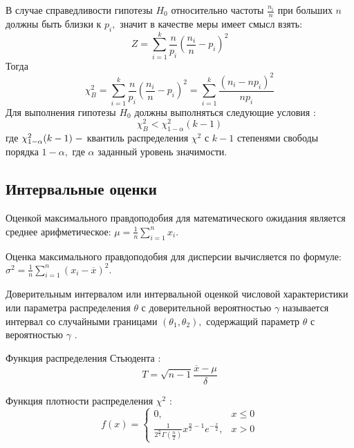 \documentclass[a4]{article}
\begin{document}
\begin{enumerate}
	В случае справедливости гипотезы $H_0$ относительно частоты $\frac{n_i}{n}$ при больших $n$ должны быть близки к $p_i,$ значит в качестве меры имеет смысл взять: 
	\begin{equation}
	    Z = \sum\limits_{i=1}^k\frac{n}{p_i}\left(\frac{n_i}{n}-p_i\right)^2
	\end{equation}
	Тогда
	\begin{equation}
	    \chi^2_B=\sum\limits_{i=1}^k\frac{n}{p_i}\left(\frac{n_i}{n}-p_i\right)^2=\sum\limits_{i=1}^k\frac{(n_i-np_i)^2}{np_i}
	\end{equation}
	Для выполнения гипотезы $H_0$ должны выполняться следующие условия :
	\begin{equation}
	    \chi_B^2 < \chi_{1-\alpha}^2(k-1)
	\end{equation}
	где $\chi_{1-\alpha}^2(k-1)\;\--$ квантиль распределения $\chi^2$ с $k-1$ степенями свободы порядка $1-\alpha,$ где $\alpha$ заданный уровень значимости.
		\end{enumerate}	
	\subsection{Интервальные оценки} %
	\label{sub:интервальные_оценки}
	Оценкой максимального правдоподобия для математического ожидания  является среднее арифметическое: $\mu=\frac{1}{n}\sum\limits_{i=1}^nx_i.$

	Оценка максимального правдоподобия для дисперсии вычисляется по формуле: $\sigma^2 = \frac{1}{n}\sum\limits_{i=1}^n(x_i-\overline{x})^2.$

	Доверительным интервалом или интервальной оценкой числовой характеристики или параметра распределения $\theta$ с доверительной вероятностью $\gamma$ называется интервал со случайными границами $(\theta_1,\theta_2),$ содержащий параметр $\theta$ с вероятностью $\gamma$ \cite{8_1}.

	Функция распределения Стьюдента :
	\begin{equation}
	    T = \sqrt{n-1}\frac{\overline{x}-\mu}{\delta}
	\end{equation}

	Функция плотности распределения $\chi^2$ :
	\begin{equation}
	    f(x) = \begin{cases}
	    0,&x\leq 0\\
	    \frac{1}{2^\frac{n}{2}\Gamma\left(\frac{n}{2}\right)}x^{\frac{n}{2}-1}e^{-\frac{x}{2}},& x>0
	    \end{cases}
	\end{equation}
\end{document}
